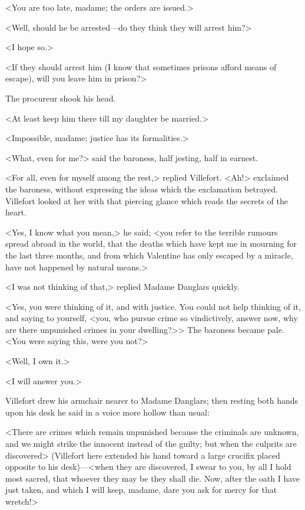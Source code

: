  <You are too late, madame; the orders are issued.> 

 <Well, should he be arrested—do they think they will arrest him?> 

 <I hope so.> 

 <If they should arrest him (I know that sometimes prisons afford means of escape), will you leave him in prison?> 

 The procureur shook his head. 

 <At least keep him there till my daughter be married.> 

 <Impossible, madame; justice has its formalities.> 

 <What, even for me?> said the baroness, half jesting, half in earnest. 

 <For all, even for myself among the rest,> replied Villefort.  <Ah!> exclaimed the baroness, without expressing the ideas which the exclamation betrayed. Villefort looked at her with that piercing glance which reads the secrets of the heart. 

 <Yes, I know what you mean,> he said; <you refer to the terrible rumours spread abroad in the world, that the deaths which have kept me in mourning for the last three months, and from which Valentine has only escaped by a miracle, have not happened by natural means.> 

 <I was not thinking of that,> replied Madame Danglars quickly. 

 <Yes, you were thinking of it, and with justice. You could not help thinking of it, and saying to yourself, <you, who pursue crime so vindictively, answer now, why are there unpunished crimes in your dwelling?>> The baroness became pale. <You were saying this, were you not?> 

 <Well, I own it.> 

 <I will answer you.> 

 Villefort drew his armchair nearer to Madame Danglars; then resting both hands upon his desk he said in a voice more hollow than usual: 

 <There are crimes which remain unpunished because the criminals are unknown, and we might strike the innocent instead of the guilty; but when the culprits are discovered> (Villefort here extended his hand toward a large crucifix placed opposite to his desk)—<when they are discovered, I swear to you, by all I hold most sacred, that whoever they may be they shall die. Now, after the oath I have just taken, and which I will keep, madame, dare you ask for mercy for that wretch!> 

